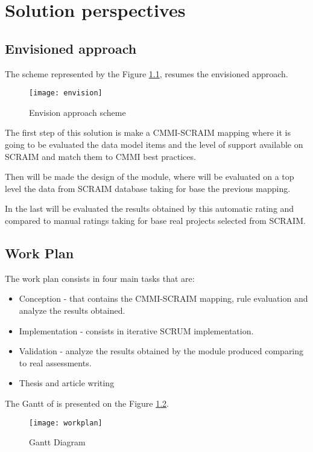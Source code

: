 \chapter{Solution perspectives}\label{chap:chap4}

\section{Envisioned approach}

The scheme represented by the Figure \ref{fig:envision}, resumes the envisioned approach.

\begin{figure}[h]
	\begin{center}
		\leavevmode
		\texttt{[image: envision]}
		\caption{Envision approach scheme}
		\label{fig:envision}
	\end{center}
\end{figure}

The first step of this solution is make a CMMI-SCRAIM mapping where it is going to be evaluated the data model items and the level of support available on SCRAIM and match them to CMMI best practices.

Then will be made the design of the module, where will be evaluated on a top level the data from SCRAIM database taking for base the previous mapping.

In the last will be evaluated the results obtained by this automatic rating and compared to manual ratings taking for base real projects selected from SCRAIM.

\section{Work Plan}

The work plan consists in four main tasks that are:
\begin{itemize}
	\item Conception - that contains the CMMI-SCRAIM mapping, rule evaluation and analyze the results obtained.
	\item Implementation - consists in iterative SCRUM implementation.
	\item Validation - analyze the results obtained by the module produced comparing to real assessments.
	\item Thesis and article writing
\end{itemize}

The Gantt of is presented on the Figure \ref{fig:workplan}.

\begin{figure}[h]
	\begin{center}
		\leavevmode
		\texttt{[image: workplan]}
		\caption{Gantt Diagram}
		\label{fig:workplan}
	\end{center}
\end{figure}